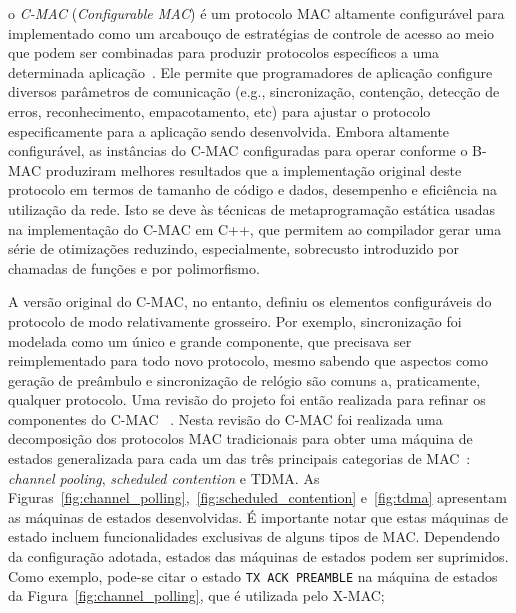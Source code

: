 o \emph{C-MAC} (\textit{Configurable MAC}) é um protocolo MAC altamente
configurável para \rssf implementado como um arcabouço de estratégias de
controle de acesso ao meio que podem ser combinadas para produzir protocolos
específicos a uma determinada aplicação~\cite{Wanner:IESS:2007}. Ele permite que
programadores de aplicação configure diversos parâmetros de comunicação (e.g.,
sincronização, contenção, detecção de erros, reconhecimento, empacotamento, etc)
para ajustar o protocolo especificamente para a aplicação sendo desenvolvida.
Embora altamente configurável, as instâncias do C-MAC configuradas para operar
conforme o B-MAC produziram melhores resultados que a implementação original
deste protocolo em termos de tamanho de código e dados, desempenho e eficiência
na utilização da rede. Isto se deve às técnicas de metaprogramação estática
usadas na implementação do C-MAC em C++, que permitem ao compilador gerar uma
série de otimizações reduzindo, especialmente, sobrecusto introduzido por
chamadas de funções e por polimorfismo.

A versão original do C-MAC, no entanto, definiu os elementos configuráveis do
protocolo de modo relativamente grosseiro. Por exemplo, sincronização foi
modelada como um único e grande componente, que precisava ser reimplementado
para todo novo protocolo, mesmo sabendo que aspectos como geração de preâmbulo e
sincronização de relógio são comuns a, praticamente, qualquer protocolo. Uma
revisão do projeto foi então realizada para refinar os componentes do C-MAC
~\cite{Steiner:ICUMT:2010}. Nesta revisão do C-MAC foi realizada uma decomposição dos
protocolos MAC tradicionais para obter uma máquina de estados generalizada para
cada um das três principais categorias de MAC~\cite{Klues:2007}: \emph{channel
pooling}, \emph{scheduled contention} e TDMA. As
Figuras~\ref{fig:channel_polling},~\ref{fig:scheduled_contention}
e~\ref{fig:tdma} apresentam as máquinas de estados desenvolvidas. É importante
notar que estas máquinas de estado incluem funcionalidades exclusivas de alguns
tipos de MAC. Dependendo da configuração adotada, estados das máquinas de
estados podem ser suprimidos. Como exemplo, pode-se citar o estado \texttt{TX
ACK PREAMBLE} na máquina de estados da Figura~\ref{fig:channel_polling}, que é
utilizada pelo X-MAC; 



